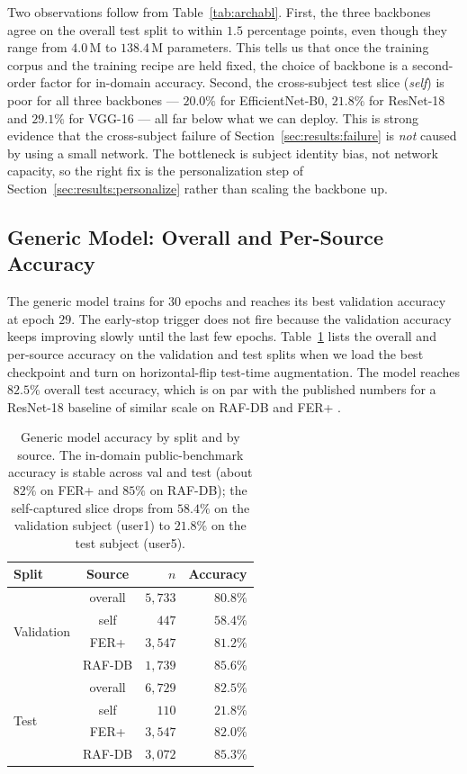 \documentclass[12pt,a4paper]{article}
\begin{document}
Two observations follow from Table~\ref{tab:archabl}. First,
the three backbones agree on the overall test split to within
$1.5$ percentage points, even though they range from $4.0$\,M
to $138.4$\,M parameters. This tells us that once the training
corpus and the training recipe are held fixed, the choice of
backbone is a second-order factor for in-domain accuracy.
Second, the cross-subject test slice (\emph{self}) is poor for
all three backbones --- $20.0\%$ for EfficientNet-B0, $21.8\%$
for ResNet-18 and $29.1\%$ for VGG-16 --- all far below what
we can deploy. This is strong evidence that the cross-subject
failure of Section~\ref{sec:results:failure} is \emph{not}
caused by using a small network. The bottleneck is subject
identity bias, not network capacity, so the right fix is the
personalization step of
Section~\ref{sec:results:personalize} rather than scaling the
backbone up.

\subsection{Generic Model: Overall and Per-Source Accuracy}
\label{sec:results:overall}

The generic model trains for $30$ epochs and reaches its best
validation accuracy at epoch $29$. The early-stop trigger does
not fire because the validation accuracy keeps improving slowly
until the last few epochs. Table~\ref{tab:overall} lists the
overall and per-source accuracy on the validation and test
splits when we load the best checkpoint and turn on
horizontal-flip test-time augmentation. The model reaches
$82.5\%$ overall test accuracy, which is on par with the
published numbers for a ResNet-18 baseline of similar scale on
RAF-DB and FER+ \autocite{wang2020ran}.

\begin{table}[H]
  \centering
  \footnotesize
  \begin{tabular}{lcrr}
    \toprule
    Split & Source & $n$ & Accuracy \\
    \midrule
    \multirow{4}{*}{Validation}
        & overall  & $5{,}733$ & $80.8\%$ \\
        & self     & $447$     & $58.4\%$ \\
        & FER+     & $3{,}547$ & $81.2\%$ \\
        & RAF-DB   & $1{,}739$ & $85.6\%$ \\
    \midrule
    \multirow{4}{*}{Test}
        & overall  & $6{,}729$ & $82.5\%$ \\
        & self     & $110$     & $21.8\%$ \\
        & FER+     & $3{,}547$ & $82.0\%$ \\
        & RAF-DB   & $3{,}072$ & $85.3\%$ \\
    \bottomrule
  \end{tabular}
  \caption{Generic model accuracy by split and by source. The
  in-domain public-benchmark accuracy is stable across val and
  test (about $82\%$ on FER+ and $85\%$ on RAF-DB); the
  self-captured slice drops from $58.4\%$ on the validation
  subject (user1) to $21.8\%$ on the test subject (user5).}
  \label{tab:overall}
\end{table}
\end{document}
